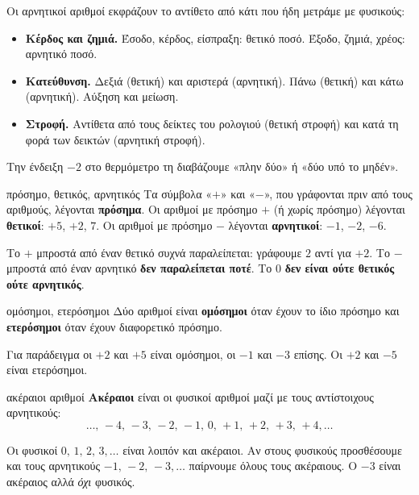 

Οι αρνητικοί αριθμοί εκφράζουν το αντίθετο από κάτι που ήδη μετράμε με φυσικούς:
\begin{itemize}[leftmargin=1.2em,itemsep=0.3ex,topsep=2pt]
\item \textbf{Κέρδος και ζημιά.} Έσοδο, κέρδος, είσπραξη: θετικό ποσό. Έξοδο, ζημιά, χρέος: αρνητικό ποσό.
\item \textbf{Κατεύθυνση.} Δεξιά (θετική) και αριστερά (αρνητική). Πάνω (θετική) και κάτω (αρνητική). Αύξηση και μείωση.
\item \textbf{Στροφή.} Αντίθετα από τους δείκτες του ρολογιού (θετική στροφή) και κατά τη φορά των δεικτών (αρνητική στροφή).
\end{itemize}
Την ένδειξη $-2$ στο θερμόμετρο τη διαβάζουμε «πλην δύο» ή «δύο υπό το μηδέν».

\begin{orismos}{πρόσημο, θετικός, αρνητικός}
Τα σύμβολα «$+$» και «$-$», που γράφονται πριν από τους αριθμούς, λέγονται \textbf{πρόσημα}. Οι αριθμοί με πρόσημο $+$ (ή χωρίς πρόσημο) λέγονται \textbf{θετικοί}: $+5$, $+2$, $7$. Οι αριθμοί με πρόσημο $-$ λέγονται \textbf{αρνητικοί}: $-1$, $-2$, $-6$.
\end{orismos}

Το $+$ μπροστά από έναν θετικό συχνά παραλείπεται: γράφουμε $2$ αντί για $+2$. Το $-$ μπροστά από έναν αρνητικό \textbf{δεν παραλείπεται ποτέ}. Το $0$ \textbf{δεν είναι ούτε θετικός ούτε αρνητικός}.

\begin{orismos}{ομόσημοι, ετερόσημοι}
Δύο αριθμοί είναι \textbf{ομόσημοι} όταν έχουν το ίδιο πρόσημο και \textbf{ετερόσημοι} όταν έχουν διαφορετικό πρόσημο.
\end{orismos}

Για παράδειγμα οι $+2$ και $+5$ είναι ομόσημοι, οι $-1$ και $-3$ επίσης. Οι $+2$ και $-5$ είναι ετερόσημοι.

\begin{orismos}{ακέραιοι αριθμοί}
\textbf{Ακέραιοι} είναι οι φυσικοί αριθμοί μαζί με τους αντίστοιχους αρνητικούς: $$\dots,\,-4,\,-3,\,-2,\,-1,\,0,\,+1,\,+2,\,+3,\,+4,\dots$$
\end{orismos}

Οι φυσικοί $0,\,1,\,2,\,3,\dots$ είναι λοιπόν και ακέραιοι. Αν στους φυσικούς προσθέσουμε και τους αρνητικούς $-1,\,-2,\,-3,\dots$ παίρνουμε όλους τους ακέραιους. Ο $-3$ είναι ακέραιος αλλά \emph{όχι} φυσικός.

